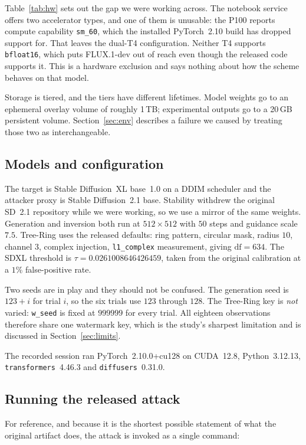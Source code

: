\documentclass[10pt,twocolumn]{article}
\newcommand{\code}[1]{\texttt{\small #1}}
\begin{document}
Table~\ref{tab:hw} sets out the gap we were working across. The notebook service
offers two accelerator types, and one of them is unusable: the P100 reports compute
capability \code{sm\_60}, which the installed PyTorch~2.10 build has dropped support
for. That leaves the dual-T4 configuration. Neither T4 supports \code{bfloat16},
which puts FLUX.1-dev out of reach even though the released code supports it. This is
a hardware exclusion and says nothing about how the scheme behaves on that model.

Storage is tiered, and the tiers have different lifetimes. Model weights go to an
ephemeral overlay volume of roughly 1\,TB; experimental outputs go to a 20\,GB
persistent volume. Section~\ref{sec:env} describes a failure we caused by treating
those two as interchangeable.

\subsection{Models and configuration}

The target is Stable Diffusion~XL base~1.0 on a DDIM scheduler and the attacker proxy
is Stable Diffusion~2.1 base. Stability withdrew the original SD~2.1 repository while
we were working, so we use a mirror of the same weights. Generation and inversion both
run at $512 \times 512$ with $50$ steps and guidance scale $7.5$. Tree-Ring uses the
released defaults: ring pattern, circular mask, radius $10$, channel $3$, complex
injection, \code{l1\_complex} measurement, giving $\mathrm{df} = 634$. The SDXL
threshold is $\tau = 0.0261008646426459$, taken from the original calibration at a
$1\%$ false-positive rate.

Two seeds are in play and they should not be confused. The generation seed is $123 + i$ for
trial $i$, so the six trials use $123$ through $128$. The Tree-Ring
key is \emph{not} varied: \code{w\_seed} is fixed at $999999$ for every trial. All
eighteen observations therefore share one watermark key, which is the study's
sharpest limitation and is discussed in Section~\ref{sec:limits}.

The recorded session ran PyTorch~2.10.0+cu128 on CUDA~12.8, Python~3.12.13,
\code{transformers}~4.46.3 and \code{diffusers}~0.31.0.

\subsection{Running the released attack}

For reference, and because it is the shortest possible statement of what the original
artifact does, the attack is invoked as a single command:
\end{document}
